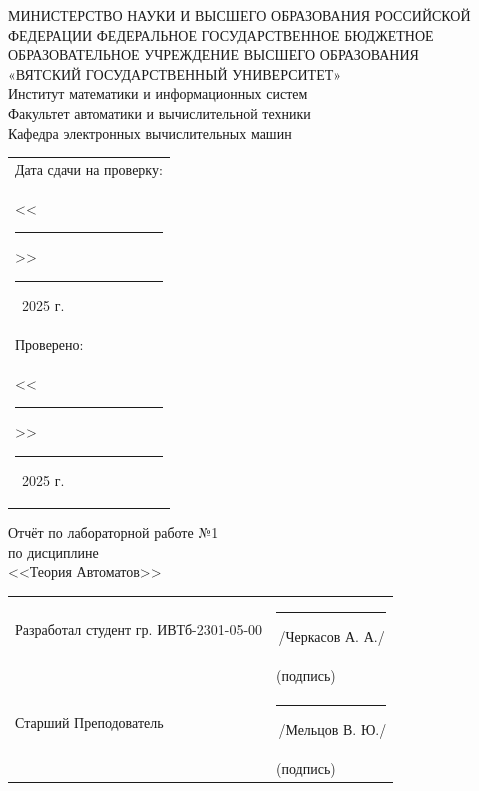 \documentclass[oneside,a4paper,14pt]{extarticle}
\begin{document}
\newpage
\thispagestyle{empty}
\begin{center}
  МИНИСТЕРСТВО НАУКИ И ВЫСШЕГО ОБРАЗОВАНИЯ РОССИЙСКОЙ ФЕДЕРАЦИИ ФЕДЕРАЛЬНОЕ ГОСУДАРСТВЕННОЕ БЮДЖЕТНОЕ ОБРАЗОВАТЕЛЬНОЕ УЧРЕЖДЕНИЕ ВЫСШЕГО ОБРАЗОВАНИЯ\\
  «ВЯТСКИЙ ГОСУДАРСТВЕННЫЙ УНИВЕРСИТЕТ»\\
  Институт математики и информационных систем\\
  Факультет автоматики и вычислительной техники\\
  Кафедра электронных вычислительных машин
\end{center}
\vspace{10mm}

\hfill
\begin{tabular}{l}
  \footnotesize Дата сдачи на проверку:                                          \\
  \footnotesize <<\rule[-1mm]{5mm}{0.10mm}\/>>\rule[-1mm]{20mm}{0.10mm}\ 2025 г. \\
  \footnotesize Проверено:                                                       \\
  \footnotesize <<\rule[-1mm]{5mm}{0.10mm}\/>>\rule[-1mm]{20mm}{0.10mm}\ 2025 г. \\
\end{tabular}
\vfill

\begin{center}
  Отчёт по лабораторной работе №1\\
  по дисциплине\\
  <<Теория Автоматов>>\\
\end{center}
\vspace{25mm}
\noindent
\begin{tabular}{ll}
  Разработал студент гр. ИВТб-2301-05-00 & \hspace{18mm}\rule[-1mm]{30mm}{0.10mm}\,/Черкасов А. А./ \\
                                         & \hspace{25.5mm}\footnotesize(подпись)                    \\
  Старший Преподователь                  & \hspace{18mm}\rule[-1mm]{30mm}{0.10mm}\,/Мельцов В. Ю./  \\
                                         & \hspace{25.5mm}\footnotesize(подпись)                    \\
\end{tabular}
\end{document}
